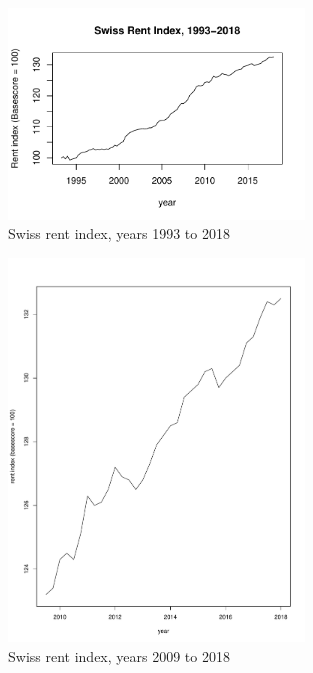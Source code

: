 \documentclass[11pt,a4paper]{article}
\begin{document}
\begin{figure}[!htb]
\centering
\includegraphics[angle=0,
width=0.7\textwidth]{indiceloyers_timeseries}
\caption{Swiss rent index, years 1993 to 2018\label{fig:indiceloyers_timeseries}}
\end{figure}
\begin{figure}[!htb]
\centering
\includegraphics[angle=0,
width=0.7\textwidth]{indiceloyers_test}
\caption{Swiss rent index, years 2009 to 2018\label{fig:indiceloyers_test}}
\end{figure}
\end{document}
